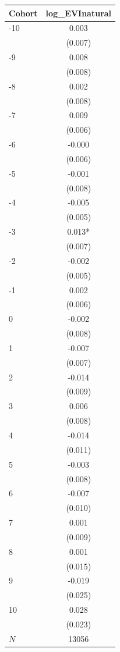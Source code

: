 {
\def\sym#1{\ifmmode^{#1}\else\(^{#1}\)\fi}
\begin{tabular}{l*{1}{c}}
\toprule
Cohort    &log\_EVInatural   \\
\midrule
-10       &    0.003   \\
          &  (0.007)   \\
-9        &    0.008   \\
          &  (0.008)   \\
-8        &    0.002   \\
          &  (0.008)   \\
-7        &    0.009   \\
          &  (0.006)   \\
-6        &   -0.000   \\
          &  (0.006)   \\
-5        &   -0.001   \\
          &  (0.008)   \\
-4        &   -0.005   \\
          &  (0.005)   \\
-3        &    0.013*  \\
          &  (0.007)   \\
-2        &   -0.002   \\
          &  (0.005)   \\
-1        &    0.002   \\
          &  (0.006)   \\
0         &   -0.002   \\
          &  (0.008)   \\
1         &   -0.007   \\
          &  (0.007)   \\
2         &   -0.014   \\
          &  (0.009)   \\
3         &    0.006   \\
          &  (0.008)   \\
4         &   -0.014   \\
          &  (0.011)   \\
5         &   -0.003   \\
          &  (0.008)   \\
6         &   -0.007   \\
          &  (0.010)   \\
7         &    0.001   \\
          &  (0.009)   \\
8         &    0.001   \\
          &  (0.015)   \\
9         &   -0.019   \\
          &  (0.025)   \\
10        &    0.028   \\
          &  (0.023)   \\
\midrule
\(N\)     &    13056   \\
\bottomrule
\end{tabular}
}
